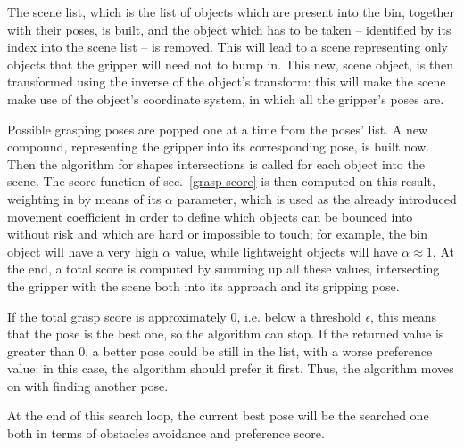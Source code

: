 The scene list, which is the list of objects which are present into
the bin, together with their poses, is built, and the object which has
to be taken -- identified by its index into the scene list -- is
removed. This will lead to a scene representing only objects that
the gripper will need not to bump in. This new, scene object, is then
transformed using the inverse of the object's transform: this will
make the scene make use of the object's coordinate system, in which
all the gripper's poses are.

Possible grasping poses are popped one at a time from the poses'
list. A new compound, representing the gripper into its corresponding
pose, is built now. Then the algorithm for shapes intersections is
called for each object into the scene. The score function of
sec.~\ref{grasp-score} is then computed on this result,
weighting in by means of its $\alpha$ parameter, which is used as the
already introduced movement coefficient in order to define which
objects can be bounced into without risk and which are hard or
impossible to touch; for example, the bin object will have a very high
$\alpha$ value, while lightweight objects will have $\alpha \approx
1$. At the end, a total score is computed by summing up all these
values, intersecting the gripper with the scene both into its approach and its
gripping pose.

If the total grasp score is approximately 0, i.e. below a threshold $\epsilon$, this means that the pose is
the best one, so the algorithm can stop. If the returned value is
greater than 0, a better pose could be still in the list, with a worse
preference value: in this case, the algorithm should prefer it
first. Thus, the algorithm moves on with finding another pose.

At the end of this search loop, the current best pose will be the
searched one both in terms of obstacles avoidance  and preference
score. 

